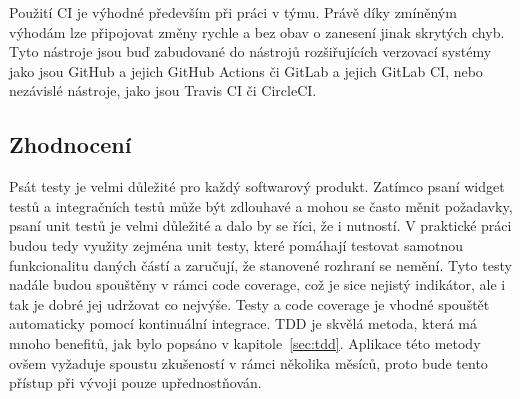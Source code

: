 Použití CI je výhodné především při práci v týmu.
Právě díky zmíněným výhodám lze připojovat změny rychle a bez obav o zanesení
jinak skrytých chyb.
Tyto nástroje jsou buď zabudované do nástrojů rozšiřujících verzovací systémy
jako jsou GitHub a jejich GitHub Actions či GitLab a jejich GitLab CI,
nebo nezávislé nástroje,
jako jsou Travis CI či CircleCI.~\cite{ci}

\subsection{Zhodnocení}

Psát testy je velmi důležité pro každý softwarový produkt.
Zatímco psaní widget testů a integračních testů může být zdlouhavé
a mohou se často měnit požadavky,
psaní unit testů je velmi důležité a dalo by se říci,
že i nutností.
V praktické práci budou tedy využity zejména unit testy,
které pomáhají testovat samotnou funkcionalitu daných částí
a zaručují,
že stanovené rozhraní se nemění.
Tyto testy nadále budou spouštěny v rámci code coverage,
což je sice nejistý indikátor,
ale i tak je dobré jej udržovat co nejvýše.
Testy a code coverage je vhodné spouštět automaticky pomocí kontinuální
integrace.
TDD je skvělá metoda,
která má mnoho benefitů,
jak bylo popsáno v kapitole~\ref{sec:tdd}.
Aplikace této metody ovšem vyžaduje spoustu zkušeností
v rámci několika měsíců,
proto bude tento přístup při vývoji pouze upřednostňován.
